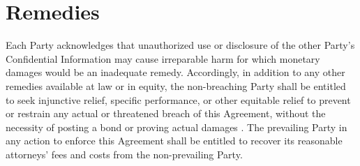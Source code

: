\section{Remedies}

Each Party acknowledges that unauthorized use or disclosure of the other Party's Confidential Information may cause irreparable harm for which monetary damages would be an inadequate remedy. Accordingly, in addition to any other remedies available at law or in equity, the non-breaching Party shall be entitled to seek injunctive relief, specific performance, or other equitable relief to prevent or restrain any actual or threatened breach of this Agreement, without the necessity of posting a bond or proving actual damages \cite{utsa2023}. The prevailing Party in any action to enforce this Agreement shall be entitled to recover its reasonable attorneys' fees and costs from the non-prevailing Party.
